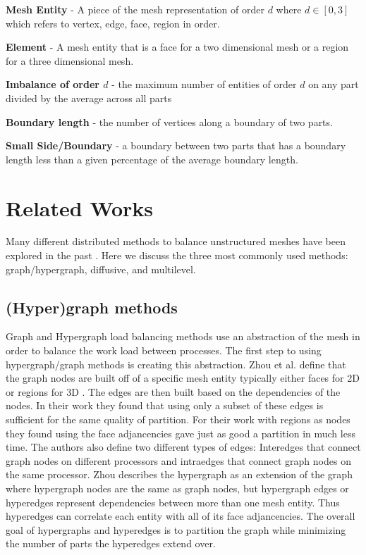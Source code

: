 \documentclass{thesis}
\begin{document}
{\bf Mesh Entity } - A piece of the mesh representation of order $d$ where $d \in [0,3]$ which refers to vertex, edge, face, region in order.

{\bf Element} - A mesh entity that is a face for a two dimensional mesh or a region for a three dimensional mesh.

{\bf Imbalance of order $d$} - the maximum number of entities of order $d$ on any part divided by the average across all parts

{\bf Boundary length} - the number of vertices along a boundary of two parts.

{\bf Small Side/Boundary} - a boundary between two parts that has a boundary length less than a given percentage of the average boundary length.


\chapter{Related Works}
Many different distributed methods to balance unstructured meshes have been 
explored in the past \cite{multidiffuse,surveygraph}. Here we discuss the 
three most commonly used methods: graph/hypergraph, diffusive, and multilevel.

\section{(Hyper)graph methods}
Graph and Hypergraph load balancing methods use an abstraction of the mesh in 
order to balance the work load between processes. The first step to using 
hypergraph/graph methods is creating this abstraction. Zhou et al. define that 
the graph nodes are built off of a specific mesh entity typically either faces 
for 2D or regions for 3D \cite{zhougraph}. The edges are then built based on the
dependencies of the nodes. In their work they found that using only a subset of 
these edges is sufficient for the same quality of partition. For their work with
regions as nodes they found using the face adjancencies gave just as good a 
partition in much less time. The authors also define two different types of 
edges: Interedges that connect graph nodes on different processors and 
intraedges that connect graph nodes on the same processor. Zhou describes the 
hypergraph as an extension of the graph where hypergraph nodes are the same as 
graph nodes, but hypergraph edges or hyperedges represent dependencies between 
more than one mesh entity. Thus hyperedges can correlate each entity with all 
of its face adjancencies. The overall goal of hypergraphs and hyperedges is to 
partition the graph while minimizing the number of parts the hyperedges extend 
over.
\end{document}
